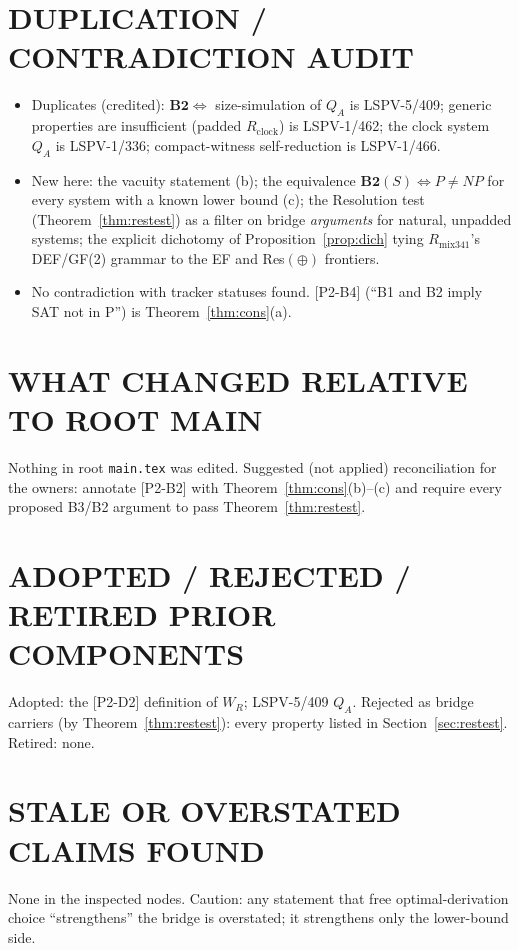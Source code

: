 \documentclass[11pt]{article}
\theoremstyle{remark}
\begin{document}
\section{DUPLICATION / CONTRADICTION AUDIT}
\begin{itemize}
\item Duplicates (credited): $\mathbf{B2}\iff$ size-simulation of $Q_A$ is LSPV-5/409; generic
properties are insufficient (padded $R_{\mathrm{clock}}$) is LSPV-1/462; the clock system $Q_A$ is
LSPV-1/336; compact-witness self-reduction is LSPV-1/466.
\item New here: the vacuity statement (b); the equivalence $\mathbf{B2}(S)\iff P\ne NP$ for every
system with a known lower bound (c); the Resolution test (Theorem~\ref{thm:restest}) as a filter
on bridge \emph{arguments} for natural, unpadded systems; the explicit dichotomy of
Proposition~\ref{prop:dich} tying $R_{\mathrm{mix341}}$'s DEF/GF(2) grammar to the EF and
Res$(\oplus)$ frontiers.
\item No contradiction with tracker statuses found. [P2-B4] (``B1 and B2 imply SAT not in P'') is
Theorem~\ref{thm:cons}(a).
\end{itemize}

\section{WHAT CHANGED RELATIVE TO ROOT MAIN}
Nothing in root \texttt{main.tex} was edited. Suggested (not applied) reconciliation for the
owners: annotate [P2-B2] with Theorem~\ref{thm:cons}(b)--(c) and require every proposed B3/B2
argument to pass Theorem~\ref{thm:restest}.

\section{ADOPTED / REJECTED / RETIRED PRIOR COMPONENTS}
Adopted: the [P2-D2] definition of $W_R$; LSPV-5/409 $Q_A$. Rejected as bridge carriers (by
Theorem~\ref{thm:restest}): every property listed in Section~\ref{sec:restest}. Retired: none.

\section{STALE OR OVERSTATED CLAIMS FOUND}
None in the inspected nodes. Caution: any statement that free optimal-derivation choice
``strengthens'' the bridge is overstated; it strengthens only the lower-bound side.
\end{document}
